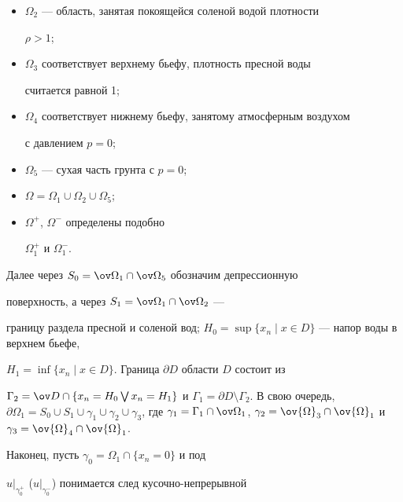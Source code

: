 \begin{itemize}


\item[] $\Omega_2$ --- область, занятая покоящейся соленой водой плотности


$\rho>1$;


\item[] $\Omega_3$ соответствует верхнему бьефу, плотность пресной воды


считается равной 1;


\item[] $\Omega_4$ соответствует нижнему бьефу, занятому атмосферным воздухом


с давлением $p=0$;


\item[] $\Omega_5$ --- сухая часть грунта с $p=0$;


\item[] $\Omega=\Omega_1\cup\Omega_2\cup\Omega_5$;


\item[] $\Omega^+$, $\Omega^-$ определены подобно


$\Omega_1^+$ и $\Omega_1^-$.


\end{itemize}





Далее через $S_0=\ov\Omega_1\cap\ov\Omega_5$ обозначим депрессионную


поверхность, а через $S_1=\ov\Omega_1\cap\ov\Omega_2$ ---


границу раздела пресной и соленой вод; $H_0=\sup\{x_n


\mid x \in D\}$ --- напор воды в верхнем бьефе,


$H_1=\inf\{x_n\mid x \in D\}$. Граница $\partial D$ области $D$ состоит из


$\Gamma_2=\ov D\cap\{x_n=H_0\bigvee x_n=H_1\}$ и $\Gamma_1=\partial D


\setminus \Gamma_2$. В свою очередь, $\partial \Omega_1 = S_0 \cup S_1 \cup


\gamma_1 \cup \gamma_2 \cup \gamma_3$, где $\gamma_1 = \Gamma_1 \cap


\ov\Omega_1$, $\gamma_2 = \ov {\Omega}_3 \cap \ov


{\Omega}_1$ и $\gamma_3 = \ov {\Omega}_4 \cap \ov {\Omega}_1$.


Наконец, пусть $\gamma_0 = \Omega_1 \cap \{ x_n = 0\} $ и под


$u|_{\gamma_0^+}$ ($u|_{\gamma_0^-}$) понимается след кусочно-непрерывной


